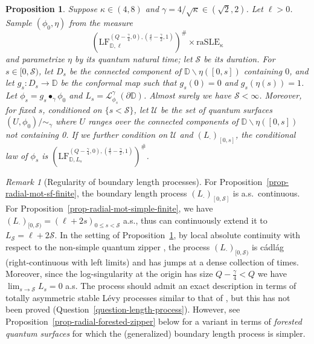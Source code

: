 \documentclass[a4paper]{article}
\numberwithin{equation}{section}
\newcommand{\bbD}{\mathbb{D}}
\newcommand{\D}{\mathbb{D}}
\newcommand{\cL}{\mathcal{L}}
\newcommand{\cS}{\mathcal{S}}
\newcommand{\qduration}{\mathcal{S}}
\newcommand{\LF}{\mathrm{LF}}
\newtheorem{proposition}[theorem]{Proposition}
\theoremstyle{remark}
\newtheorem{remark}[theorem]{Remark}
\numberwithin{equation}{section}
\begin{document}
\begin{proposition}\label{prop-radial-mot-swallow-finite}
Suppose $\kappa \in (4, 8)$ and $\gamma = 4/\sqrt\kappa \in (\sqrt2,2)$. Let $\ell > 0$. Sample $(\phi_0,\eta)$
    from the measure 
    \[
    (\LF_{\bbD, \ell}^{(Q-\frac{\gamma}{4},0),(\frac4\gamma - \frac\gamma2,1)})^\#\times \mathrm{raSLE}_\kappa
    \]
    and parametrize {$\eta$} by its quantum natural time; let $\qduration$ be its duration. For $s \in [0, \qduration)$, let $D_s$ be the connected component of $\D \backslash \eta([0,s])$ containing $0$, and let $g_s: D_s \to \D$ be the conformal map such that $g_s(0) = 0$ and $g_s(\eta(s)) = 1$. Let $\phi_s = g_s \bullet_\gamma \phi_0$ and $L_s = \cL_{\phi_s}^\gamma(\partial \D)$. Almost surely we have $\qduration < \infty$. Moreover, for fixed $s$, conditioned on $\{s < \cS\}$, let $\mathcal U$ be the set of quantum surfaces $(U, \phi_0)/{\sim_\gamma}$ where $U$ ranges over the connected components of $\D\backslash \eta([0,s])$ not containing 0. 
    If we further condition on $\mathcal U$ and $(L_\cdot)_{[0,s]}$, the conditional law of $\phi_s$ is $(\LF_{\D, L_s}^{(Q - \frac\gamma4, 0), (\frac4\gamma - \frac\gamma2, 1)})^\#$.
\end{proposition}
\begin{remark}[{Regularity of boundary length processes}]\label{rem-bdy-reg}
For Proposition~\ref{prop-radial-mot-sf-finite}, the boundary length process $(L_\cdot)_{[0,\qduration]}$ is a.s.\ continuous. For Proposition~\ref{prop-radial-mot-simple-finite}, we have $(L_\cdot)_{[0,\qduration)} = (\ell + 2s)_{0 \leq s < \qduration}$ a.s., thus can continuously extend it to $L_\qduration = \ell + 2 \qduration$.
In the setting of Proposition~\ref{prop-radial-mot-swallow-finite}, by local absolute continuity with respect to the non-simple quantum zipper \cite[Theorem 1.18, Corollary 1.19]{DMS14}, the process $(L_\cdot)_{[0,\qduration)}$ is c\'adl\'ag (right-continuous with left limits) and has jumps at a dense collection of times. Moreover, since the log-singularity at the origin has size $Q - \frac\gamma4 < Q$ we have $\lim_{s \to \qduration} L_s = 0$ a.s. The process should admit an exact description in terms of totally asymmetric stable L\'evy processes similar to that of \cite[Theorem 1.2]{ms-finite-mating}, but this has not been proved (Question~\ref{question-length-process}). However, see Proposition~\ref{prop-radial-forested-zipper} below for a variant in terms of \emph{forested quantum surfaces} for which the (generalized) boundary length process is simpler. 
\end{remark}
\end{document}
